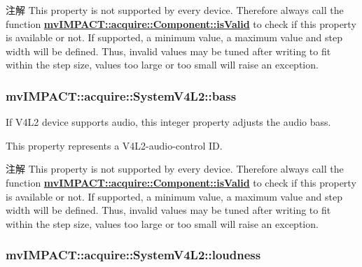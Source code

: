 \begin{DoxyNote}{注解}
This property is not supported by every device. Therefore always call the function {\bfseries \hyperlink{classmv_i_m_p_a_c_t_1_1acquire_1_1_component_ac51e55e7e046101f3c6119d84123abd5}{mv\+I\+M\+P\+A\+C\+T\+::acquire\+::\+Component\+::is\+Valid}} to check if this property is available or not. If supported, a minimum value, a maximum value and step width will be defined. Thus, invalid values may be tuned after writing to fit within the step size, values too large or too small will raise an exception. 
\end{DoxyNote}
\hypertarget{classmv_i_m_p_a_c_t_1_1acquire_1_1_system_v4_l2_adc8687d88c348d97408a71df4d4c325d}{
\subsubsection[{bass}]{ mv\+I\+M\+P\+A\+C\+T\+::acquire\+::\+System\+V4\+L2\+::bass}}\label{classmv_i_m_p_a_c_t_1_1acquire_1_1_system_v4_l2_adc8687d88c348d97408a71df4d4c325d}


If V4\+L2 device supports audio, this integer property adjusts the audio bass. 

This property represents a V4\+L2-\/audio-\/control I\+D.

\begin{DoxyNote}{注解}
This property is not supported by every device. Therefore always call the function {\bfseries \hyperlink{classmv_i_m_p_a_c_t_1_1acquire_1_1_component_ac51e55e7e046101f3c6119d84123abd5}{mv\+I\+M\+P\+A\+C\+T\+::acquire\+::\+Component\+::is\+Valid}} to check if this property is available or not. If supported, a minimum value, a maximum value and step width will be defined. Thus, invalid values may be tuned after writing to fit within the step size, values too large or too small will raise an exception. 
\end{DoxyNote}
\hypertarget{classmv_i_m_p_a_c_t_1_1acquire_1_1_system_v4_l2_a0d985a0ecf44621535546bdee8b981ca}{
\subsubsection[{loudness}]{ mv\+I\+M\+P\+A\+C\+T\+::acquire\+::\+System\+V4\+L2\+::loudness}}\label{classmv_i_m_p_a_c_t_1_1acquire_1_1_system_v4_l2_a0d985a0ecf44621535546bdee8b981ca}


